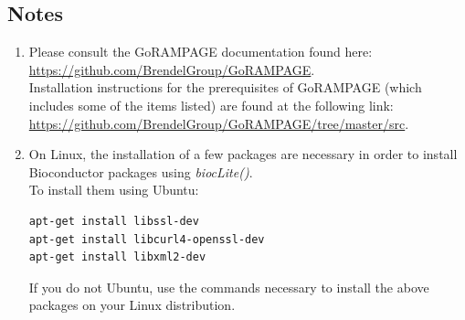 \documentclass[runningheads,a4paper]{llncs}
\begin{document}
\begin{linenumbers}
\section{Notes}
\begin{enumerate}
\item Please consult the GoRAMPAGE documentation found here:\\
 \url{https://github.com/BrendelGroup/GoRAMPAGE}.\\
Installation instructions for the prerequisites of GoRAMPAGE (which includes some of the items listed) are found at the following link:\\
 \url{https://github.com/BrendelGroup/GoRAMPAGE/tree/master/src}.
\item On Linux, the installation of a few packages are necessary in order to install Bioconductor packages using \textit{biocLite()}.\\
To install them using Ubuntu:

\begin{verbatim}
apt-get install libssl-dev
apt-get install libcurl4-openssl-dev
apt-get install libxml2-dev
\end{verbatim}

If you do not Ubuntu, use the commands necessary to install the above packages on your Linux distribution.


\end{enumerate}
\end{linenumbers}
\end{document}
